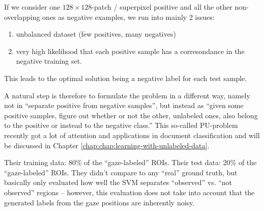 If we consider one $128 \times 128$-patch / superpixel positive and all the other non-overlapping ones as negative examples, we run into mainly 2 issues: 
\begin{enumerate}
 \item unbalanced dataset (few positives, many negatives)
 \item very high likelihood that each positive sample has a corresondance in the negative training set.
\end{enumerate}
This leads to the optimal solution being a negative label for each test sample.

A natural step is therefore to formulate the problem in a different way, namely not in ``separate positive from negative samples'', but instead as ``given some positive samples, figure out whether or not the other, unlabeled ones, also belong to the positive or instead to the negative class.'' 
This so-called PU-problem recently got a lot of attention and applications in document classification and will be discussed in Chapter \ref{chap:chap:learning-with-unlabeled-data}.

Their training data: 80\% of the ``gaze-labeled'' ROIs. Their test data: 20\% of the ``gaze-labeled'' ROIs. They didn't compare to any ``real'' ground truth, but basically only evaluated how well the SVM separates ``observed'' vs. ``not observed'' regions  -- however, this evaluation does not take into account that the generated labels from the gaze positions are inherently noisy.

